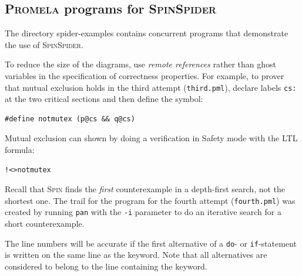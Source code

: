 \documentclass[11pt]{article}
\newcommand{\spn}{\textsc{Spin}}
\newcommand{\prm}{\textsc{Promela}}
\newcommand{\spd}{\textsc{SpinSpider}}
\newcommand{\p}[1]{\texttt{#1}}
\newcommand{\bu}[1]{\textsf{#1}}
\begin{document}
\subsection{\prm{} programs for \spd{}}
The directory \bu{spider-examples} contains concurrent programs that demonstrate
the use of \spd{}.

To reduce the size of the diagrams, use \emph{remote references} rather than
ghost variables in the specification of correctness properties. For example, to
prover that mutual exclusion holds in the third attempt (\p{third.pml}), declare
labels \p{cs:} at the two critical sections and then define the symbol:
\begin{verbatim}
#define notmutex (p@cs && q@cs)
\end{verbatim}
Mutual exclusion can shown by doing a verification in \bu{Safety} mode
with the LTL formula:
\begin{verbatim}
!<>notmutex
\end{verbatim}
Recall that \spn{} finds the \emph{first} counterexample in a depth-first
search, not the shortest one. The trail for the program for the fourth
attempt (\p{fourth.pml}) was created by running \p{pan} with the \p{-i}
parameter to do an iterative search for a short counterexample.

The line numbers will be accurate if the first alternative of a \p{do}- or 
\p{if}-statement is written on the same line as the keyword. Note that all 
alternatives are considered to belong to the line containing the keyword.

\end{document}
